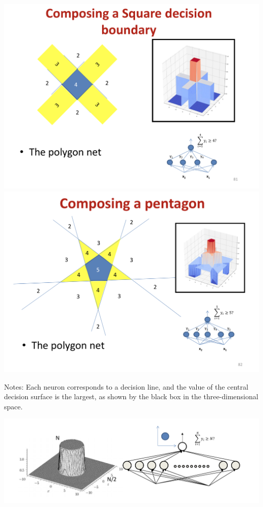 \documentclass{article}
\begin{document}
	\includegraphics[scale=0.2]{26.png}
	\includegraphics[scale=0.2]{27.png}
	
	Notes: Each neuron corresponds to a decision line, and the value of the central decision surface is the largest, as shown by the black box in the three-dimensional space.
	
	\includegraphics[scale=0.2]{28.png}
	
\end{document}
